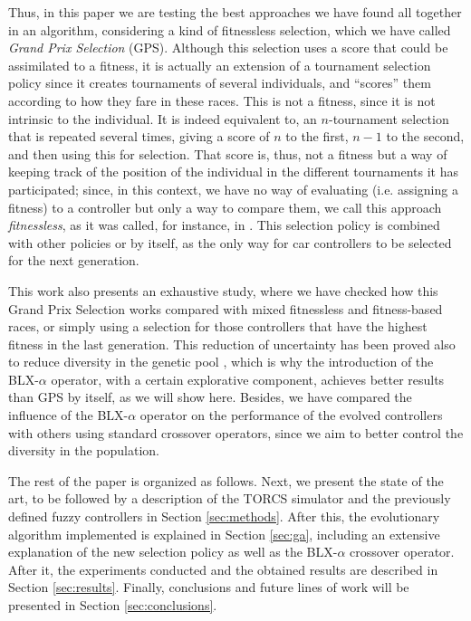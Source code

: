 \documentclass[10pt,journal,compsoc]{IEEEtran}
\begin{document}
Thus, in this paper we are testing the best approaches we have found all together in an algorithm, considering a kind of fitnessless selection, which we have called \textit{Grand Prix Selection} (GPS). Although this selection uses a score that could be assimilated to a fitness, it is actually an extension of a tournament selection policy since it creates tournaments of several individuals, and ``scores'' them according to how they fare in these races. This is not a fitness, since it is not intrinsic to the individual. It is indeed equivalent to, an $n$-tournament selection that is repeated several times, giving a score of $n$ to the first, $n-1$ to the second, and then using this for selection. That score is, thus, not a fitness but a way of keeping track of the position of the individual in the different tournaments it has participated; since, in this context, we have no way of evaluating (i.e. assigning a fitness) to a controller but only a way to compare them, we call this approach {\em fitnessless}, as it was called, for instance, in \cite{jaskowski2008winning}.
This selection policy is combined with other policies or by itself, as the only way for car controllers to be selected for the next generation.

This work also presents an exhaustive study, where we have checked how this Grand Prix Selection works compared with mixed fitnessless and fitness-based races, or simply using a selection for those controllers that have the highest fitness in the last generation.  
This reduction of uncertainty has been proved also to reduce diversity in the genetic pool \cite{DBLP:journals/tcci/MereloLFGCCRMGTCC16}, which is why the introduction of the \mbox{BLX-$\alpha$} operator, with a certain explorative component, achieves better results than GPS by itself, as we will show here.
Besides, we have compared the influence of the \mbox{BLX-$\alpha$} operator on the performance of the evolved controllers with others using standard crossover operators, since we aim to better control the diversity in the population.

The rest of the paper is organized as follows. Next, we present the
state of the art, to be followed by a description of the TORCS
simulator and the previously defined fuzzy controllers in Section
\ref{sec:methods}. After this, the evolutionary algorithm implemented
is explained in Section \ref{sec:ga}, including an extensive explanation of the new selection policy as well as the BLX-$\alpha$ crossover operator. After it, the experiments conducted and the obtained results are described in
Section \ref{sec:results}. Finally, conclusions and future lines of
work will be presented in Section \ref{sec:conclusions}. 
\end{document}
